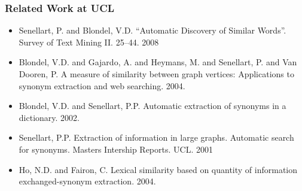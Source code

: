 \documentclass{beamer}
\begin{document}
\begin{frame}
\frametitle{Related Work at UCL}

{
\footnotesize
\begin{itemize}
  \item Senellart, P. and Blondel, V.D. ``Automatic Discovery of Similar Words''. Survey of Text Mining II. 25--44. 2008
  \item Blondel, V.D. and Gajardo, A. and Heymans, M. and Senellart, P. and Van Dooren, P. A measure of similarity between graph vertices: Applications to synonym extraction and web searching. 2004.
  \item Blondel, V.D. and Senellart, P.P. Automatic extraction of synonyms in a dictionary. 2002.
  \item Senellart, P.P. Extraction of information in large graphs. Automatic search for synonyms. Masters Intership Reports. UCL. 2001
  \item Ho, N.D. and Fairon, C. Lexical similarity based on quantity of information exchanged-synonym extraction. 2004.
  \end{itemize}
  }

\end{frame}
\end{document}
